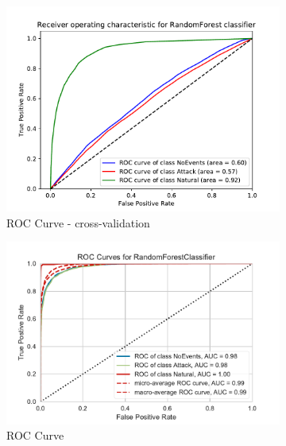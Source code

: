 \begin{figure}[H]
    \centering
    \begin{subfigure}[t]{0.33\textwidth}
        \centering
        \includegraphics[page=1, width=\linewidth]{images/results_scikit/RandomForest}
        \caption{ROC Curve - cross-validation}
        \label{fig:scikit_RF_ROC}
    \end{subfigure}
    \begin{subfigure}[t]{0.33\textwidth}
        \centering
        \includegraphics[page=1, width=\linewidth]{images/roc_3c}
        \caption{ROC Curve}
        \label{fig:scikit_RF_ROC}
    \end{subfigure}
    \begin{subfigure}[t]{0.3\textwidth}
        \centering

\end{subfigure}
\end{figure}
